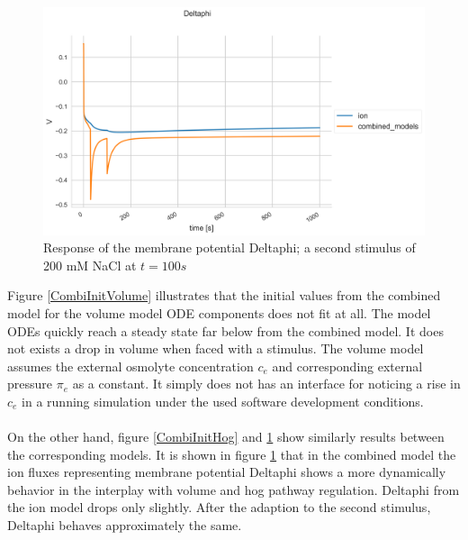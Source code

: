 \begin{figure}[h!]
	\begin{center}
		\begin{minipage}{0,8\textwidth}
			
			\includegraphics[width=\textwidth]{picture/Deltaphi_71.png}
			\caption{Response of the membrane potential Deltaphi; a second stimulus of 200 mM NaCl at $t=100s$ } 
			\label{CombiInitIon} 
		\end{minipage}
	\end{center}
\end{figure}
Figure \ref{CombiInitVolume} illustrates that the initial values from the combined model for the volume model ODE components does not fit at all. The model ODEs quickly reach a steady state far below from the combined model. It does not exists a drop in volume when faced with a stimulus. The volume model assumes the external osmolyte concentration $c_e$ and corresponding external pressure $\pi_e$ as a constant. It simply does not has an interface for noticing a rise in $c_e$ in a running simulation under the used software development conditions.\\\\
On the other hand, figure \ref{CombiInitHog} and \ref{CombiInitIon} show similarly results between the corresponding models. It is shown in figure \ref{CombiInitIon} that in the combined model the ion fluxes representing membrane potential Deltaphi shows a more dynamically behavior in the interplay with volume and hog pathway regulation. Deltaphi from the ion model drops only slightly. After the adaption to the second stimulus, Deltaphi behaves approximately the same.\\\\\\\\

\newpage
